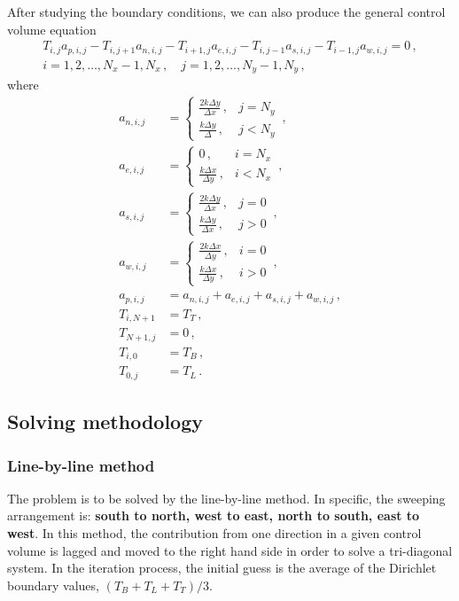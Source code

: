 \documentclass{article}
\begin{document}
After studying the boundary conditions, we can also produce the general control volume equation
\begin{multline}
	\label{eq:CV}
	T_{i,j} a_{p,i,j} - T_{i, j+1} a_{n,i,j} - T_{i+1, j} a_{e,i,j} - T_{i, j-1} a_{s,i,j} - T_{i-1, j} a_{w,i,j} = 0\,,\\ i = 1, 2, \ldots, N_x - 1, N_x\,, \quad j = 1, 2, \ldots, N_y - 1, N_y\,,
\end{multline}
where
\begin{align*}
	a_{n,i,j} & = \begin{cases}
		\frac{2 k \Delta y}{\Delta x}\,, & j = N_y \\
		\frac{k \Delta y}{\Delta }\,, & j < N_y
	\end{cases}\,, \\
	a_{e,i,j} & = \begin{cases}
		0\,, & i = N_x \\
		\frac{k \Delta  x}{\Delta y}\,, & i < N_x
	\end{cases}\,, \\
	a_{s,i,j} & = \begin{cases}
		\frac{2 k \Delta y}{\Delta x}\,, & j = 0 \\
		\frac{k \Delta y}{\Delta x}\,, & j > 0
	\end{cases}\,, \\
	a_{w,i,j} & = \begin{cases}
		\frac{2 k \Delta x}{\Delta y}\,, & i = 0 \\
		\frac{k \Delta x}{\Delta y}\,, & i > 0
	\end{cases}\,, \\
	a_{p,i,j} & = a_{n,i,j} + a_{e,i,j} + a_{s,i,j} + a_{w,i,j}\,, \\
	T_{i, N+1} & = T_T\,, \\
	T_{N+1, j} & = 0\,, \\
	T_{i, 0} & = T_B\,, \\
	T_{0,j} & = T_L\,.
\end{align*}

\subsection*{Solving methodology}

\subsubsection*{Line-by-line method}

The problem is to be solved by the line-by-line method. In specific, the sweeping arrangement is: \textbf{south to north, west to east, north to south, east to west}. In this method, the contribution from one direction in a given control volume is lagged and moved to the right hand side in order to solve a tri-diagonal system. In the iteration process, the initial guess is the average of the Dirichlet boundary values, $(T_B + T_L + T_T) / 3$.
\end{document}
